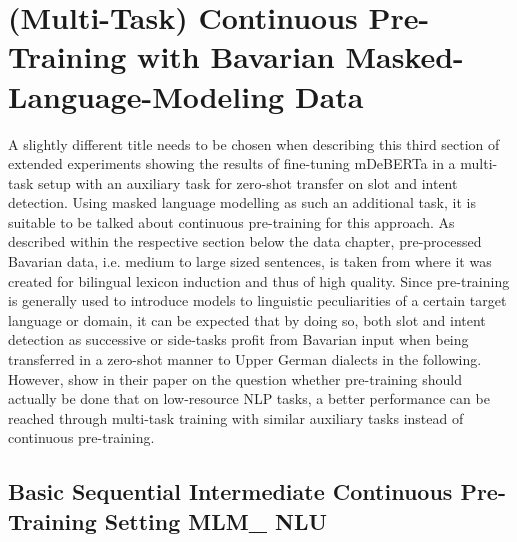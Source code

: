 \documentclass[11pt,a4paper,twoside,openright]{scrbook}
\begin{document}
\section{(Multi-Task) Continuous Pre-Training with Bavarian Masked-Language-Modeling Data}

A slightly different title needs to be chosen when describing this third section of extended experiments showing the results of fine-tuning mDeBERTa in a multi-task setup with an auxiliary task for zero-shot transfer on slot and intent detection. Using masked language modelling as such an additional task, it is suitable to be talked about continuous pre-training for this approach. As described within the respective section below the data chapter, pre-processed Bavarian data, i.e. medium to large sized sentences, is taken from \citet{artemova-plank-2023-low} where it was created for bilingual lexicon induction and thus of high quality. Since pre-training is generally used to introduce models to linguistic peculiarities of a certain target language or domain, it can be expected that by doing so, both slot and intent detection as successive or side-tasks profit from Bavarian input when being transferred in a zero-shot manner to Upper German dialects in the following. However, \citet{dery2022pretraining} show in their paper on the question whether pre-training should actually be done that on low-resource NLP tasks, a better performance can be reached through multi-task training with similar auxiliary tasks instead of continuous pre-training.






\subsection{Basic Sequential Intermediate Continuous Pre-Training Setting MLM\_ NLU}
\end{document}
